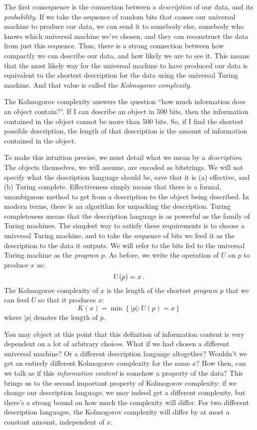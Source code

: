 The first consequence is the connection between a \emph{description} of our data, and its \emph{probability}. If we take the sequence of random bits that causes our universal machine to produce our data, we can send it to somebody else, somebody who knows which universal machine we've chosen, and they can reconstruct the data from just this sequence. Thus, there is a strong connection between how compactly we can describe our data, and how likely we are to see it. This means that the most likely way for the universal machine to have produced our data is equivalent to the shortest description for the data using the universal Turing machine. And that value is called the \emph{Kolmogorov complexity}. 

The Kolmogorov complexity answers the question ``how much information does an object contain?''. If I can describe an object in 500 bits, then the information contained in the object cannot be more than 500 bits. So, if I find the shortest possible description, the length of that description is the amount of information contained in the object. 

To make this intuition precise, we must detail what we mean by a \emph{description}. The objects themselves, we will assume, are encoded as bitstrings. We will not specify what the description language should be, save that it is (a) effective, and (b) Turing complete. Effectiveness simply means that there is a formal, unambiguous method to get from a description to the object being described. In modern terms, there is an algorithm for unpacking the description. Turing completeness means that the description language is as powerful as the family of Turing machines. The simplest way to satisfy these requirements is to choose a universal Turing machine, and to take the sequence of bits we feed it as the description to the data it outputs. We will refer to the bits fed to the universal Turing machine as the \emph{program} $p$. As before, we write the operation of $U$ on $p$ to produce $x$ as:
\[
U(p) = x \,\text{.}
\]  
The Kolmogorov complexity of $x$ is the length of the shortest \emph{program} $p$ that we can feed $U$ so that it produces $x$:
\[
K(x) = \min \left \{ |p| : U(p) = x\right \}
\]
where $|p|$ denotes the length of $p$.


You may object at this point that this definition of information content is very dependent on a lot of arbitrary choices. What if we had chosen a different universal machine? Or a different description language altogether? Wouldn't we get an entirely different Kolmogorov complexity for the same $x$? How then, can we talk as if this \emph{information content} is somehow a property of the data? This brings us to the second important property of Kolmogorov complexity: if we change our description language, we may indeed get a different complexity, but there's a strong bound on how much the complexity will differ. For two different description languages, the Kolmogorov complexity will differ by at most a constant amount, independent of $x$. 

